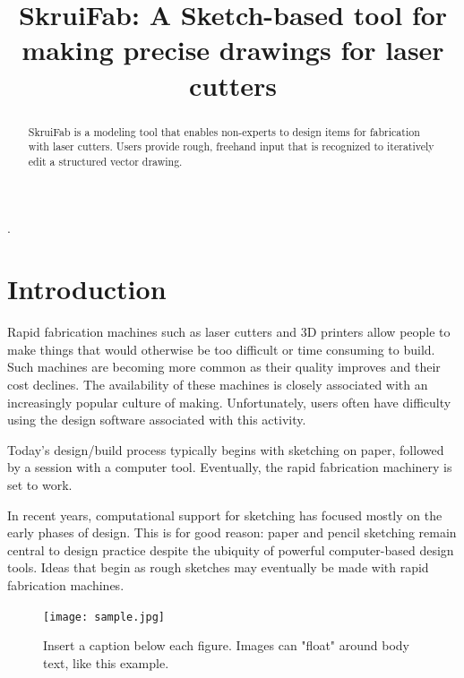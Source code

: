 \documentclass{chi-ext}
\title{SkruiFab: A Sketch-based tool for making precise drawings for
  laser cutters}
\author{
  \alignauthor{
  	\textbf{First Author}\\
  	\affaddr{AuthorCo, Inc.}\\
  	\affaddr{Authortown, PA 54321 USA}\\
  	\email{author1@anotherco.com}
  }\alignauthor{
  	\textbf{Second Author}\\
  	\affaddr{AuthorCo, Inc.}\\
  	\affaddr{123 Author Ave.}\\
  	\email{author2@anotherco.com}
  }
}
\def\plainkeywords{comma, separated, keywords, here}
\begin{document}
\maketitle

\begin{abstract}
SkruiFab is a modeling tool that enables non-experts to design items
for fabrication with laser cutters. Users provide rough, freehand
input that is recognized to iteratively edit a structured vector
drawing. 
\end{abstract}

\keywords{\plainkeywords}
.


\section{Introduction}

Rapid fabrication machines such as laser cutters and 3D printers allow
people to make things that would otherwise be too difficult or time
consuming to build. Such machines are becoming more common as their
quality improves and their cost declines. The availability of these
machines is closely associated with an increasingly popular culture of
making. Unfortunately, users often have difficulty using the design
software associated with this activity.

Today's design/build process typically begins with sketching on paper,
followed by a session with a computer tool. Eventually, the rapid
fabrication machinery is set to work. 

In recent years, computational support for sketching has focused
mostly on the early phases of design. This is for good reason: paper
and pencil sketching remain central to design practice despite the
ubiquity of powerful computer-based design tools. Ideas that begin as
rough sketches may eventually be made with rapid fabrication machines.


\begin{figure}
\hspace*{-0.4\columnwidth}%
\parbox{1.4\columnwidth}{
  \centering
  \texttt{[image: sample.jpg]}
  \caption{Insert a caption below each figure. Images can "float" around body text, like this example.}
  \label{fig:sample}
}
\end{figure}
\end{document}
